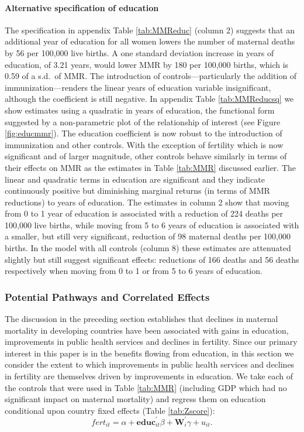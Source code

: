 \documentclass{article}[12pt,subeqn]
\begin{document}
\begin{spacing}{1.4}
\paragraph{Alternative specification of education}
The specification in appendix Table \ref{tab:MMReduc} (column 2) suggests that an additional year of education for 
all women lowers the number of maternal deaths by 56 per 100,000 live births. A one standard deviation increase in 
years of education, of 3.21 years, would lower MMR by 180 per 100,000 births, which is 0.59 of a s.d.\ of MMR. The
introduction of controls---particularly the addition of immunization---renders the linear years of education variable 
insignificant, although the coefficient is still negative. In appendix Table \ref{tab:MMReducsq} we show estimates 
using a quadratic in years of education, the functional form suggested by a non-parametric plot of the relationship
of interest (see Figure \ref{fig:educmmr}). The education coefficient is now robust to the introduction of immunization 
and other controls. With the exception of fertility which is now significant and of larger magnitude, other controls 
behave similarly in terms of their effects on MMR as the estimates in Table \ref{tab:MMR} discussed earlier. The linear 
and quadratic terms in education are significant and they indicate continuously positive but diminishing marginal 
returns (in terms of MMR reductions) to years of education. The estimates in column 2 show that moving from 0 to 1 year 
of education is associated with a reduction of 224 deaths per 100,000 live births, while moving from 5 to 6 years of 
education is associated with a smaller, but still very significant, reduction of 98 maternal deaths per 100,000 
births. In the model with all controls (column 8) these estimates are attenuated slightly but still suggest significant 
effects: reductions of 166 deaths and 56 deaths respectively when moving from 0 to 1 or from 5 to 6 years of education.

\subsubsection{Potential Pathways and Correlated Effects}
\label{ssscn:effects}
The discussion in the preceding section establishes that declines in maternal mortality in developing countries 
have been associated with gains in education, improvements in public health services
and declines in fertility. Since our primary interest in this paper is in the benefits flowing from education, 
in this section we consider the extent to which improvements in public health services and declines in fertility
are themselves driven by improvements in education. We take each of the controls that were used in Table
\ref{tab:MMR} (including GDP which had no significant impact on maternal mortality) and regress them on education
conditional upon country fixed effects (Table \ref{tab:Zscore}):
\begin{equation}
 \label{eqn:Zscore}
  fert_{it}=\alpha + \mathbf{educ}^\prime_{it}\beta + \mathbf{W}^\prime_i\gamma + u_{it}.
\end{equation}


\end{spacing}
\end{document}
